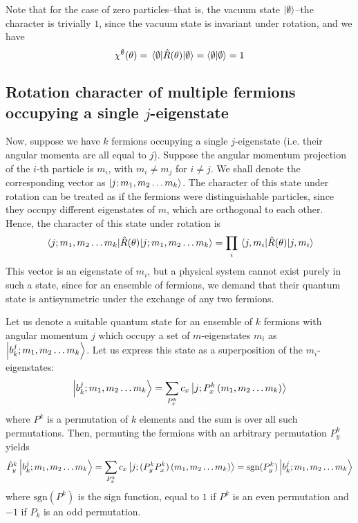 \documentclass[12pt]{article}
\newcommand{\sgn}{\text{sgn}}
\begin{document}
	Note that for the case of zero particles--that is, the vacuum state $\ket{\emptyset}$--the character is trivially $1$, since the vacuum state is invariant under rotation, and we have
	\begin{equation} \label{vacuum_character}
	\chi^\emptyset(\theta)=\mel{\emptyset}{\hat{R}(\theta)}{\emptyset}=\braket{\emptyset}{\emptyset}=1
	\end{equation}
	
	\subsection{Rotation character of multiple fermions occupying a single $j$-eigenstate}
	Now, suppose we have $k$ fermions occupying a single $j$-eigenstate (i.e. their angular momenta are all equal to $j$). Suppose the angular momentum projection of the $i$-th particle is $m_i$, with $m_i\neq m_j$ for $i\neq j$. We shall denote the corresponding vector as $\ket{j; m_1, m_2\dots m_k}$. The character of this state under rotation can be treated as if the fermions were distinguishable particles, since they occupy different eigenstates of $m$, which are orthogonal to each other. Hence, the character of this state under rotation is
	\begin{equation}
	\mel{j; m_1, m_2\dots m_k}{\hat{R}(\theta)}{j; m_1, m_2\dots m_k}=\prod_i \mel{j, m_i}{\hat{R}(\theta)}{j, m_i}
	\end{equation}
	This vector is an eigenstate of $m_i$, but a physical system cannot exist purely in such a state, since for an ensemble of fermions, we demand that their quantum state is antisymmetric under the exchange of any two fermions.
	
	Let us denote a suitable quantum state for an ensemble of $k$ fermions with angular momentum $j$ which occupy a set of $m$-eigenstates $m_i$ as $\ket{b^j_k; m_1, m_2\dots m_k}$. Let us express this state as a superposition of the $m_i$-eigenstates:
	\begin{equation}
	\ket{b^j_k; m_1, m_2\dots m_k}=\sum_{P^k_x}c_x\ket{j; P^k_x\left(m_1, m_2\dots m_k\right)}
	\end{equation}
	 where $P^k$ is a permutation of $k$ elements and the sum is over all such permutations. Then, permuting the fermions with an arbitrary permutation $P^k_y$ yields
	 \begin{equation}
	 \hat{P}^k_y\ket{b^j_k; m_1, m_2\dots m_k}=\sum_{P^k_x}c_x\ket{j; (P^k_yP^k_x)\left(m_1, m_2\dots m_k\right)}=\sgn(P^k_y)\ket{b^j_k; m_1, m_2\dots m_k}
	 \end{equation}
	where $\sgn(P^k)$ is the sign function, equal to $1$ if $P^k$ is an even permutation and $-1$ if $P_k$ is an odd permutation.
	
\end{document}
